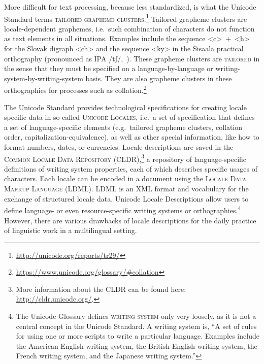 More difficult for text processing, because less standardized, is what the
Unicode Standard terms \textsc{tailored grapheme clusters}.\footnote{\url{http://unicode.org/reports/tr29/}} 
Tailored grapheme clusters are locale-dependent graphemes, i.e.~such combination of characters do
not function as text elements in all situations. Examples include the sequence
<c>~+~<h> for the Slovak digraph <ch> and the sequence <ky> in the Sisaala
practical orthography (pronounced as IPA /tʃ/,~\cite{Moran2006}). These grapheme
clusters are \textsc{tailored} in the sense that they must be specified on a
language-by-language or writing-system-by-writing-system basis. They are also 
grapheme clusters in these orthographies for processes such as collation.\footnote{\url{https://www.unicode.org/glossary/#collation}}

The Unicode Standard provides technological specifications for creating locale specific data
in so-called \textsc{Unicode Locales}, i.e.~a set of specification
that defines a set of language-specific elements (e.g.~tailored grapheme
clusters, collation order, capitalization-equivalence), as well as other special
information, like how to format numbers, dates, or currencies. Locale
descriptions are saved in the \textsc{Common Locale Data Repository
(CLDR)},\footnote{More information about the CLDR can be found here:
\url{http://cldr.unicode.org/}.} a repository of
language-specific definitions of writing system properties, each of which
describes specific usages of characters. Each locale can be encoded in a
document using the \textsc{Locale Data Markup Language (LDML)}. LDML is an XML
format and vocabulary for the exchange of structured locale data. Unicode Locale
Descriptions allow users to define language- or even resource-specific writing
systems or orthographies.\footnote{The Unicode Glossary defines \textsc{writing
system} only very loosely, as it is not a central concept in the Unicode
Standard. A writing system is, ``A set of rules for using one or more scripts to
write a particular language. Examples include the American English writing
system, the British English writing system, the French writing system, and the
Japanese writing system.''} However, there are various drawbacks of locale
descriptions for the daily practice of linguistic work in a multilingual setting.
